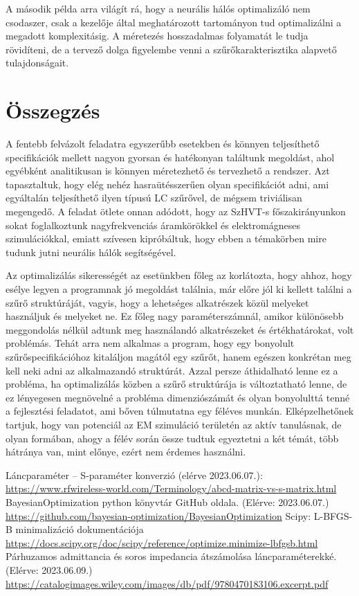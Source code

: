         A második példa arra világít rá, hogy a neurális hálós optimalizáló nem csodaszer, csak a kezelője által meghatározott tartományon tud optimalizálni a megadott komplexitásig. A méretezés hosszadalmas folyamatát le tudja rövidíteni, de a tervező dolga figyelembe venni a szűrőkarakterisztika alapvető tulajdonságait.

\section{Összegzés}
	A fentebb felvázolt feladatra egyszerűbb esetekben és könnyen teljesíthető specifikációk mellett nagyon gyorsan és hatékonyan találtunk megoldást, ahol egyébként analitikusan is könnyen méretezhető és tervezhető a rendszer. Azt tapasztaltuk, hogy elég nehéz hasraütésszerűen olyan specifikációt adni, ami egyáltalán teljesíthető ilyen típusú LC szűrővel, de mégsem triviálisan megengedő. A feladat ötlete onnan adódott, hogy az SzHVT-s főszakirányunkon sokat foglalkoztunk nagyfrekvenciás áramkörökkel és elektromágneses szimulációkkal, emiatt szívesen kipróbáltuk, hogy ebben a témakörben mire tudunk jutni neurális hálók segítségével.

	Az optimalizálás sikerességét az esetünkben főleg az korlátozta, hogy ahhoz, hogy esélye legyen a programnak jó megoldást találnia, már előre jól ki kellett találni a szűrő struktúráját, vagyis, hogy a lehetséges alkatrészek közül melyeket használjuk és melyeket ne. Ez főleg nagy paraméterszámnál, amikor különösebb meggondolás nélkül adtunk meg használandó alkatrészeket és értékhatárokat, volt problémás. Tehát arra nem alkalmas a program, hogy egy bonyolult szűrőspecifikációhoz kitaláljon magától egy szűrőt, hanem egészen konkrétan meg kell neki adni az alkalmazandó struktúrát. Azzal persze áthidalható lenne ez a probléma, ha optimalizálás közben a szűrő struktúrája is változtatható lenne, de ez lényegesen megnövelné a probléma dimenziószámát és olyan bonyolulttá tenné a fejlesztési feladatot, ami bőven túlmutatna egy féléves munkán. Elképzelhetőnek tartjuk, hogy van potenciál az EM szimuláció területén az aktív tanulásnak, de olyan formában, ahogy a félév során össze tudtuk egyeztetni a két témát, több hátránya van, mint előnye, ezért nem érdemes használni.

\clearpage
\begin{thebibliography}{9}
     Láncparaméter -- S-paraméter konverzió (elérve 2023.06.07.): \url{https://www.rfwireless-world.com/Terminology/abcd-matrix-vs-s-matrix.html}
     BayesianOptimization python könyvtár GitHub oldala. (Elérve: 2023.06.07.) \url{https://github.com/bayesian-optimization/BayesianOptimization}
     Scipy: L-BFGS-B minimalizáció dokumentációja \url{https://docs.scipy.org/doc/scipy/reference/optimize.minimize-lbfgsb.html}
	 Párhuzamos admittancia és soros impedancia átszámolása láncparaméterekké. (Elérve: 2023.06.09.) \url{https://catalogimages.wiley.com/images/db/pdf/9780470183106.excerpt.pdf}
\end{thebibliography}

